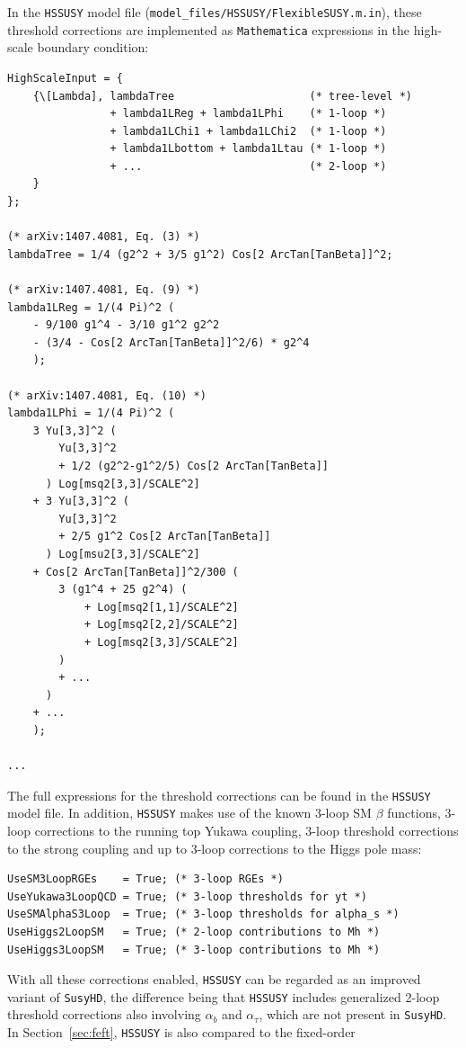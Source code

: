 \documentclass[final,3p,11pt,pdflatex]{elsarticle}
\makeatletter
\newcommand{\modelname}[1]{\texttt{#1}\@\xspace}
\newcommand{\HSSUSY}{\modelname{HSSUSY}}
\newcommand{\susyhd}{\texttt{SusyHD}\@\xspace}
\newcommand{\mathematica}{\texttt{Ma\-the\-ma\-ti\-ca}\xspace}
\newcommand{\code}[1]{\lstinline|#1|}  %
\newcommand{\secref}[1]{Section~\ref{#1}}
\def\ab{\alpha_b}
\def\atau{\alpha_{\tau}}
\makeatother
\begin{document}
In the \HSSUSY model file
(\code{model_files/HSSUSY/FlexibleSUSY.m.in}), these threshold
corrections are implemented as \mathematica expressions in the
high-scale boundary condition:
%
\begin{lstlisting}
HighScaleInput = {
    {\[Lambda], lambdaTree                     (* tree-level *)
                + lambda1LReg + lambda1LPhi    (* 1-loop *)
                + lambda1LChi1 + lambda1LChi2  (* 1-loop *)
                + lambda1Lbottom + lambda1Ltau (* 1-loop *)
                + ...                          (* 2-loop *)
    }
};

(* arXiv:1407.4081, Eq. (3) *)
lambdaTree = 1/4 (g2^2 + 3/5 g1^2) Cos[2 ArcTan[TanBeta]]^2;

(* arXiv:1407.4081, Eq. (9) *)
lambda1LReg = 1/(4 Pi)^2 (
    - 9/100 g1^4 - 3/10 g1^2 g2^2
    - (3/4 - Cos[2 ArcTan[TanBeta]]^2/6) * g2^4
    );

(* arXiv:1407.4081, Eq. (10) *)
lambda1LPhi = 1/(4 Pi)^2 (
    3 Yu[3,3]^2 (
        Yu[3,3]^2
        + 1/2 (g2^2-g1^2/5) Cos[2 ArcTan[TanBeta]]
      ) Log[msq2[3,3]/SCALE^2]
    + 3 Yu[3,3]^2 (
        Yu[3,3]^2
        + 2/5 g1^2 Cos[2 ArcTan[TanBeta]]
      ) Log[msu2[3,3]/SCALE^2]
    + Cos[2 ArcTan[TanBeta]]^2/300 (
        3 (g1^4 + 25 g2^4) (
            + Log[msq2[1,1]/SCALE^2]
            + Log[msq2[2,2]/SCALE^2]
            + Log[msq2[3,3]/SCALE^2]
        )
        + ...
      )
    + ...
    );

...
\end{lstlisting}
%
The full expressions for the threshold corrections can be found in the
\HSSUSY model file.  In addition, \HSSUSY makes use of the known
3-loop SM $\beta$ functions, 3-loop corrections to the
running top Yukawa coupling, 3-loop threshold corrections to the
strong coupling and up to 3-loop corrections to the Higgs pole mass:
%
\begin{lstlisting}
UseSM3LoopRGEs    = True; (* 3-loop RGEs *)
UseYukawa3LoopQCD = True; (* 3-loop thresholds for yt *)
UseSMAlphaS3Loop  = True; (* 3-loop thresholds for alpha_s *)
UseHiggs2LoopSM   = True; (* 2-loop contributions to Mh *)
UseHiggs3LoopSM   = True; (* 3-loop contributions to Mh *)
\end{lstlisting}
%
With all these corrections enabled, \HSSUSY can be regarded as an
improved variant of \susyhd \cite{Vega:2015fna}, the difference being
that \HSSUSY includes generalized 2-loop threshold corrections also
involving $\ab$ and $\atau$, which are not present in \susyhd.  In
\secref{sec:feft}, \HSSUSY is also compared to the fixed-order
\end{document}
